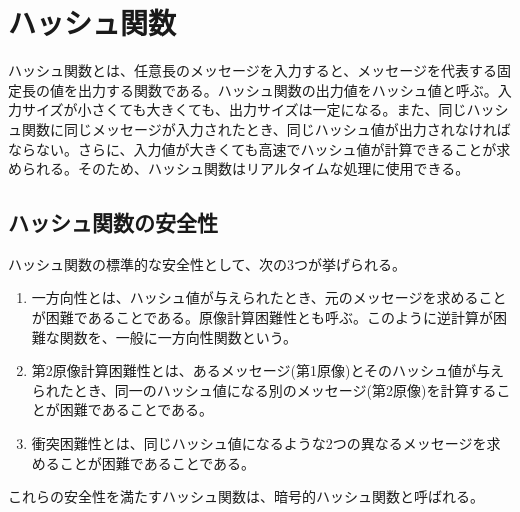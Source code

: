 \documentclass{thesis}
\begin{document}



\section{ハッシュ関数}
ハッシュ関数\cite{ハッシュ関数}とは、任意長のメッセージを入力すると、メッセージを代表する固定長の値を出力する関数である。ハッシュ関数の出力値をハッシュ値と呼ぶ。入力サイズが小さくても大きくても、出力サイズは一定になる。また、同じハッシュ関数に同じメッセージが入力されたとき、同じハッシュ値が出力されなければならない。さらに、入力値が大きくても高速でハッシュ値が計算できることが求められる。そのため、ハッシュ関数はリアルタイムな処理に使用できる。

\subsection{ハッシュ関数の安全性}
ハッシュ関数の標準的な安全性として、次の3つが挙げられる。
\begin{enumerate}[・]
\item {}

一方向性とは、ハッシュ値が与えられたとき、元のメッセージを求めることが困難であることである。原像計算困難性とも呼ぶ。このように逆計算が困難な関数を、一般に一方向性関数という。
\item {}

第2原像計算困難性とは、あるメッセージ(第1原像)とそのハッシュ値が与えられたとき、同一のハッシュ値になる別のメッセージ(第2原像)を計算することが困難であることである。
\item {}

衝突困難性とは、同じハッシュ値になるような2つの異なるメッセージを求めることが困難であることである。
\end{enumerate}
これらの安全性を満たすハッシュ関数は、暗号的ハッシュ関数と呼ばれる\cite{ハッシュ関数}。
\end{document}
